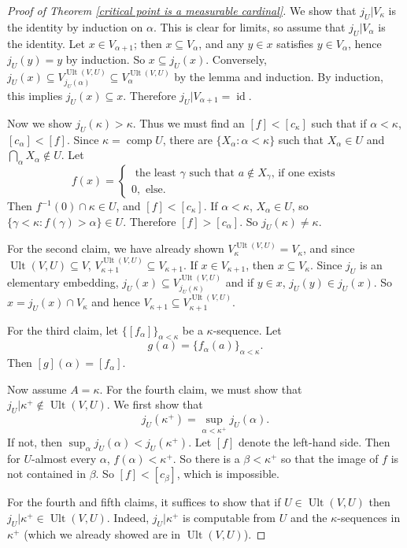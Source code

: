 \documentclass[12pt]{report}
\newcommand{\id}{\operatorname{id}}
\DeclareMathOperator{\comp}{comp}
\DeclareMathOperator{\Ult}{Ult}
\theoremstyle{definition}
\begin{document}
\begin{proof}[Proof of Theorem \ref{critical point is a measurable cardinal}]
We show that $j_U|V_\kappa$ is the identity by induction on $\alpha$. This is clear for limits, so assume that $j_U|V_\alpha$ is the identity.
Let $x \in V_{\alpha + 1}$; then $x \subseteq V_\alpha$, and any $y \in x$ satisfies $y \in V_\alpha$, hence $j_U(y) = y$ by induction.
So $x \subseteq j_U(x)$.
Conversely, $j_U(x) \subseteq V_{j_U(\alpha)}^{\Ult(V, U)} \subseteq V_\alpha^{\Ult(V, U)}$ by the lemma and induction. By induction, this implies $j_U(x) \subseteq x$. Therefore $j_U|V_{\alpha + 1} = \id$.

Now we show $j_U(\kappa) > \kappa$. Thus we must find an $[f] < [c_\kappa]$ such that if $\alpha < \kappa$, $[c_\alpha] < [f]$.
Since $\kappa = \comp U$, there are $\{X_\alpha: \alpha < \kappa\}$ such that $X_\alpha \in U$ and $\bigcap_\alpha X_\alpha \notin U$. Let
$$f(x) = \begin{cases}
\text{ the least $\gamma$ such that $a \notin X_\gamma$, if one exists}\\
0,\text{ else.}
\end{cases}$$
Then $f^{-1}(0) \cap \kappa \in U$, and $[f] < [c_\kappa]$. If $\alpha < \kappa$, $X_\alpha \in U$, so $\{\gamma < \kappa: f(\gamma) > \alpha\} \in U$. Therefore $[f] > [c_\alpha]$. So $j_U(\kappa) \neq \kappa$.

For the second claim, we have already shown $V_\kappa^{\Ult(V, U)} = V_\kappa$, and since $\Ult(V, U) \subseteq V$, $V_{\kappa + 1}^{\Ult(V, U)} \subseteq V_{\kappa + 1}$.
If $x \in V_{\kappa + 1}$, then $x \subseteq V_\kappa$. Since $j_U$ is an elementary embedding, $j_U(x) \subseteq V_{j_U(\kappa)}^{\Ult(V, U)}$ and if $y \in x$, $j_U(y) \in j_U(x)$.
So $x = j_U(x) \cap V_\kappa$ and hence $V_{\kappa + 1} \subseteq V_{\kappa + 1}^{\Ult(V, U)}$.

For the third claim, let $\{[f_\alpha]\}_{\alpha < \kappa}$ be a $\kappa$-sequence. Let
$$g(a) = \{f_\alpha(a)\}_{\alpha < \kappa}.$$
Then $[g](\alpha) = [f_\alpha]$.

Now assume $A = \kappa$. For the fourth claim, we must show that $j_U|\kappa^+ \notin \Ult(V, U)$. We first show that
$$j_U(\kappa^+) = \sup_{\alpha < \kappa^+} j_U(\alpha).$$
If not, then $\sup_\alpha j_U(\alpha) < j_U(\kappa^+)$. Let $[f]$ denote the left-hand side. Then for $U$-almost every $\alpha$, $f(\alpha) < \kappa^+$.
So there is a $\beta < \kappa^+$ so that the image of $f$ is not contained in $\beta$. So $[f] < [c_\beta]$, which is impossible.

For the fourth and fifth claims, it suffices to show that if $U \in \Ult(V, U)$ then $j_U|\kappa^+ \in \Ult(V, U)$.
Indeed, $j_U|\kappa^+$ is computable from $U$ and the $\kappa$-sequences in $\kappa^+$ (which we already showed are in $\Ult(V, U)$).
\end{proof}
\end{document}
